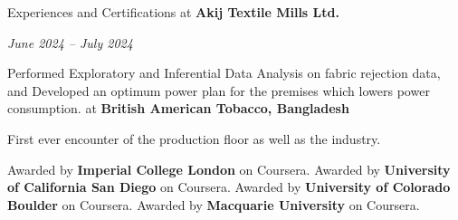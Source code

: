 \begin{rubric}{Experiences and Certifications}
 at  \textbf{Akij Textile Mills Ltd.}
    \par \emph{June 2024 – July 2024}
    \par Performed Exploratory and Inferential Data Analysis on
    fabric rejection data, and Developed an optimum power plan
    for the premises which lowers power consumption.
     at \textbf{British American Tobacco, Bangladesh}
    \par First ever encounter of the production floor as well as the industry.


     Awarded by \textbf{Imperial College London} on Coursera.
     Awarded by \textbf{University of California San Diego} on Coursera.
     Awarded by \textbf{University of Colorado Boulder} on Coursera.
     Awarded by \textbf{Macquarie University} on Coursera.

\end{rubric}

